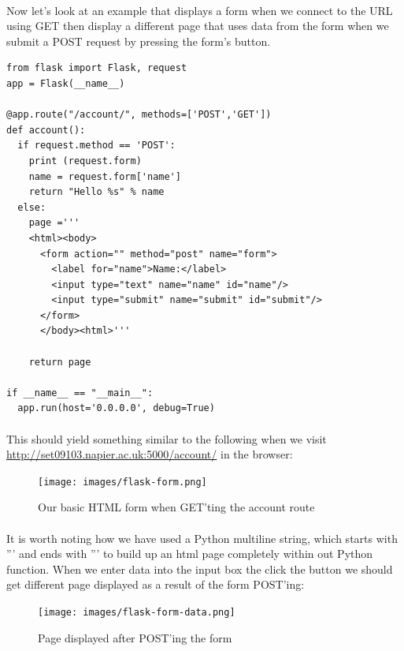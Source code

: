 \documentclass[12pt, a4paper, oneside]{book}
\begin{document}
\paragraph{} Now let's look at an example that displays a form when we connect to the URL using GET then display a different page that uses data from the form when we submit a POST request by pressing the form's button.

\begin{lstlisting}
from flask import Flask, request
app = Flask(__name__)

@app.route("/account/", methods=['POST','GET'])
def account():
  if request.method == 'POST':
    print (request.form)
    name = request.form['name']
    return "Hello %s" % name
  else:
    page ='''
    <html><body>
      <form action="" method="post" name="form">
        <label for="name">Name:</label>
        <input type="text" name="name" id="name"/>
        <input type="submit" name="submit" id="submit"/>
      </form>
      </body><html>'''

    return page
    
if __name__ == "__main__":
  app.run(host='0.0.0.0', debug=True)
\end{lstlisting}

\paragraph{} This should yield something similar to the following when we visit \url{http://set09103.napier.ac.uk:5000/account/} in the browser:

\begin{figure}[H]
\centering
\texttt{[image: images/flask-form.png]}
\caption{Our basic HTML form when GET'ting the account route}
\label{fig:flask-form}
\end{figure}

\paragraph{} It is worth noting how we have used a Python multiline string, which starts with ''' and ends with ''' to build up an html page completely within out Python function. When we enter data into the input box the click the button we should get different page displayed as a result of the form POST'ing:

\begin{figure}[H]
\centering
\texttt{[image: images/flask-form-data.png]}
\caption{Page displayed after POST'ing the form}
\label{fig:flask-form-data}
\end{figure}
\end{document}
